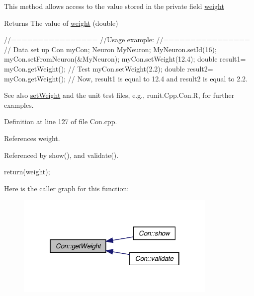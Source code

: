 This method allows access to the value stored in the private field \hyperlink{class_con_a7f46485ba5b41971ea38641f9e7d1be0}{weight} \begin{DoxyReturn}{Returns}
The value of \hyperlink{class_con_a7f46485ba5b41971ea38641f9e7d1be0}{weight} (double)
\end{DoxyReturn}

\begin{DoxyCode}
        //================
        //Usage example:
        //================
        // Data set up
                Con myCon;
                Neuron MyNeuron;
                MyNeuron.setId(16);
                myCon.setFromNeuron(&MyNeuron);
                myCon.setWeight(12.4);
                double result1= myCon.getWeight();
        // Test
                myCon.setWeight(2.2);
                double result2= myCon.getWeight();
        // Now, result1 is equal to 12.4 and result2 is equal to 2.2.
\end{DoxyCode}


\begin{DoxySeeAlso}{See also}
\hyperlink{class_con_aa9b30bb7eda5c5578d11a65977968d38}{setWeight} and the unit test files, e.g., runit.Cpp.Con.R, for further examples. 
\end{DoxySeeAlso}


Definition at line 127 of file Con.cpp.



References weight.



Referenced by show(), and validate().


\begin{DoxyCode}
                       {
        return(weight);
}
\end{DoxyCode}


Here is the caller graph for this function:\nopagebreak
\begin{figure}[H]
\begin{center}
\leavevmode
\includegraphics[width=274pt]{class_con_a385c5bf6eb9e2ffc94c5b427c287ccb2_icgraph}
\end{center}
\end{figure}


